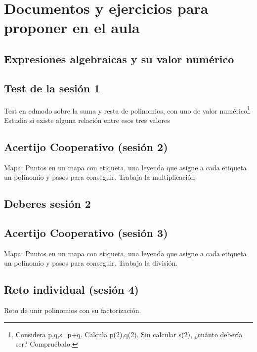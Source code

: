\chapter{Documentos y ejercicios para proponer en el aula}


\section{Expresiones algebraicas y su valor numérico}
\label{app:DocModel}



\section{Test de la sesión 1}
\label{test:ses1}

Test en edmodo sobre la suma y resta de polinomios, con uno de valor numérico\footnote{Considera p,q,s=p+q. Calcula p(2),q(2). Sin calcular s(2), ¿cuánto debería ser? Compruébalo.}
%
Estudia si existe alguna relación entre esos tres valores 

\section{Acertijo Cooperativo (sesión 2)}
\label{app:ses2:coop}


Mapa: Puntos en un mapa con etiqueta, una leyenda que asigne a cada etiqueta un polinomio y pasos para conseguir.
%
Trabaja la multiplicación


\section{Deberes sesión 2}
\label{app:ses2:deberes}



\section{Acertijo Cooperativo (sesión 3)}
\label{app:ses3:coop}


Mapa: Puntos en un mapa con etiqueta, una leyenda que asigne a cada etiqueta un polinomio y pasos para conseguir.
%
Trabaja la división.

\section{Reto individual (sesión 4)}
\label{app:ses4:indiv}

Reto de unir polinomios con su factorización.


